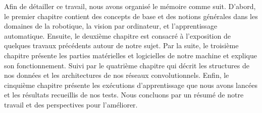 Afin de détailler ce travail, nous avons organisé le mémoire comme suit.
D'abord, le premier chapitre contient des concepts de base et des notions générales dans
les domaines de la robotique, la vision par ordinateur, et l'apprentissage automatique.
Ensuite, le deuxième chapitre est consacré à l'exposition de quelques travaux précédents
autour de notre sujet. Par la suite, le troisième chapitre présente les parties
matérielles et logicielles de notre machine et explique son fonctionnement.
Suivi par le quatrième chapitre qui décrit les structures de nos données et les
architectures de nos réseaux convolutionnels. Enfin, le cinquième chapitre présente
les exécutions d'apprentissage que nous avons lancées et les résultats recueillis
de nos tests. Nous concluons par un résumé de notre travail et des perspectives
pour l'améliorer.
